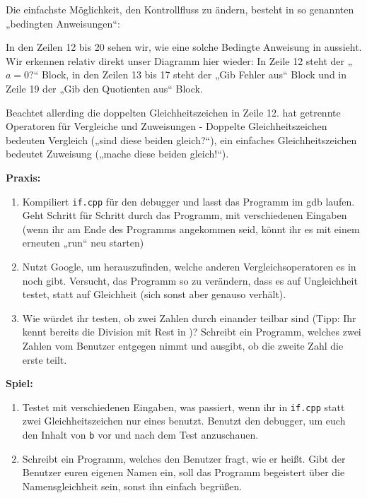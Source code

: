 Die einfachste Möglichkeit, den Kontrollfluss zu ändern, besteht in so
genannten „bedingten Anweisungen“:

In den Zeilen 12 bis 20 sehen wir, wie eine solche Bedingte Anweisung in \Cpp
aussieht. Wir erkennen relativ direkt unser Diagramm hier wieder: In Zeile 12
steht der „$a=0$?“ Block, in den Zeilen 13 bis 17 steht der „Gib Fehler aus“
Block und in Zeile 19 der „Gib den Quotienten aus“ Block.

Beachtet allerding die doppelten Gleichheitszeichen in Zeile 12. \Cpp hat
getrennte Operatoren für Vergleiche und Zuweisungen - Doppelte
Gleichheitszeichen bedeuten Vergleich („sind diese beiden gleich?“), ein
einfaches Gleichheitszeichen bedeutet Zuweisung („mache diese beiden gleich!“).

\textbf{Praxis:}
\begin{enumerate}
    \item Kompiliert \texttt{if.cpp} für den debugger und lasst das Programm im
        gdb laufen. Geht Schritt für Schritt durch das Programm, mit
        verschiedenen Eingaben (wenn ihr am Ende des Programms angekommen seid,
        könnt ihr es mit einem erneuten „run“ neu starten)
    \item Nutzt Google, um herauszufinden, welche anderen Vergleichsoperatoren
        es in \Cpp noch gibt. Versucht, das Programm so zu verändern, dass es
        auf Ungleichheit testet, statt auf Gleichheit (sich sonst aber genauso
        verhält).
    \item Wie würdet ihr testen, ob zwei Zahlen durch einander teilbar sind
        (Tipp: Ihr kennt bereits die Division mit Rest in \Cpp)? Schreibt ein
        Programm, welches zwei Zahlen vom Benutzer entgegen nimmt und ausgibt,
        ob die zweite Zahl die erste teilt.
\end{enumerate}

\textbf{Spiel:}
\begin{enumerate}
    \item Testet mit verschiedenen Eingaben, was passiert, wenn ihr in
        \texttt{if.cpp} statt zwei Gleichheitszeichen nur eines benutzt.
        Benutzt den debugger, um euch den Inhalt von \texttt{b} vor und nach
        dem Test anzuschauen.
    \item Schreibt ein Programm, welches den Benutzer fragt, wie er heißt. Gibt
        der Benutzer euren eigenen Namen ein, soll das Programm begeistert über
        die Namensgleichheit sein, sonst ihn einfach begrüßen.
\end{enumerate}
